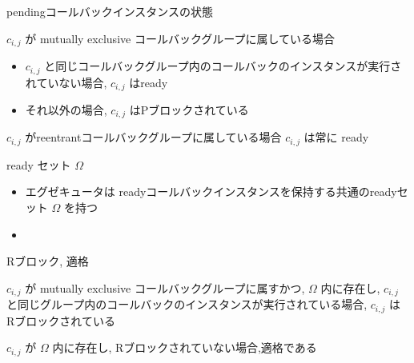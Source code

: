 \begin{frame}{pendingコールバックインスタンスの状態}
    \begin{block}{$c_{i, j}$ が mutually exclusive コールバックグループに属している場合}
        \setlength{\linewidth}{0.98\columnwidth}
        \begin{itemize}
            \item $c_{i, j}$ と同じコールバックグループ内のコールバックのインスタンスが実行されていない場合, $c_{i, j}$ はready
            \item それ以外の場合, $c_{i, j}$ はPブロックされている
        \end{itemize}
    \end{block}
    \begin{block}{$c_{i, j}$ がreentrantコールバックグループに属している場合}
        $c_{i, j}$ は常に ready
    \end{block}
\end{frame}

\begin{frame}{ready セット $\Omega$}
    \begin{itemize}
        \item エグゼキュータは readyコールバックインスタンスを保持する共通のreadyセット $\Omega$ を持つ
        \item {}
    \end{itemize}
\end{frame}

\begin{frame}{Rブロック, 適格}
    \begin{definition}[Rブロック]
        $c_{i, j}$ が mutually exclusive コールバックグループに属すかつ, $\Omega$ 内に存在し, $c_{i, j}$ と同じグループ内のコールバックのインスタンスが実行されている場合, $c_{i, j}$ は Rブロックされている
    \end{definition}
    \begin{definition}[適格]
        $c_{i, j}$ が $\Omega$ 内に存在し, Rブロックされていない場合,適格である
    \end{definition}
\end{frame}

